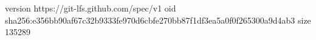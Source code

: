 version https://git-lfs.github.com/spec/v1
oid sha256:e356bb90af67c32b9333fe970d6cbfe270bb87f1df3ea5a0f0f265300a9d4ab3
size 135289
